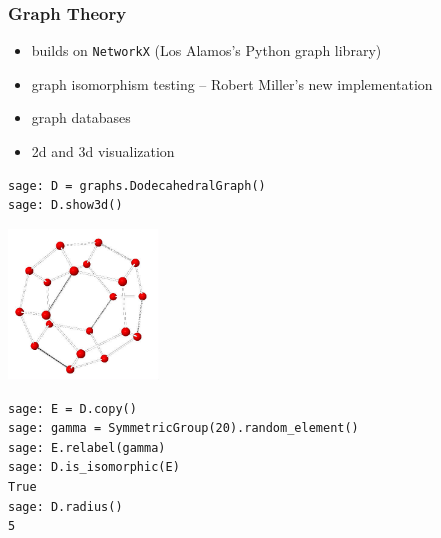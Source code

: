 \documentclass[9pt]{beamer}
\begin{document}
\begin{frame}[fragile]
\frametitle{Graph Theory}
\begin{itemize}
\item builds on {\tt NetworkX} (Los Alamos's Python graph library)
\item graph isomorphism testing -- Robert Miller's new implementation
\item graph databases
\item 2d and 3d visualization
\end{itemize}
\begin{lstlisting}
sage: D = graphs.DodecahedralGraph()
sage: D.show3d()
\end{lstlisting}
\vspace{-5em}
\begin{flushright}
\includegraphics[width=0.3\textwidth]{graph3d.jpeg}
\end{flushright}
\vspace{-2em}
\begin{lstlisting}
sage: E = D.copy()
sage: gamma = SymmetricGroup(20).random_element()
sage: E.relabel(gamma)
sage: D.is_isomorphic(E)
True
sage: D.radius()
5
\end{lstlisting}
\end{frame}
\end{document}
